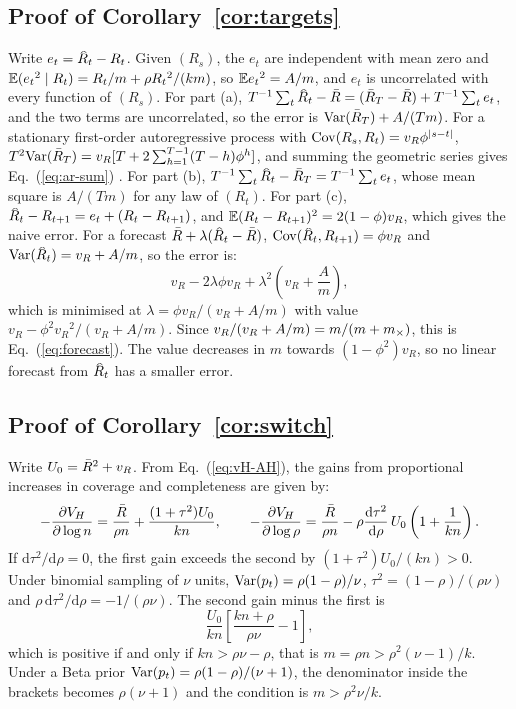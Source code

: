 \subsection{Proof of Corollary~\ref{cor:targets}}
\label{app:cor-targets}

Write $e_t=\Rhat_t-R_t$. Given $(R_s)$, the $e_t$ are independent with mean zero and $\mathbb{E}(e_t{}^2\mid R_t)=R_t/m+\rho R_t{}^2/(km)$, so $\mathbb{E} e_t{}^2=A/m$, and $e_t$ is uncorrelated with every function of $(R_s)$. For part (a), $T^{-1}\sum_t\Rhat_t-\Rbar=(\Rbar_T-\Rbar)+T^{-1}\sum_te_t$, and the two terms are uncorrelated, so the error is $\mathrm{Var}(\bar{R}_T)+A/(Tm)$. For a stationary first-order autoregressive process with $\mathrm{Cov}(R_s,R_t)=v_R\phi^{|s-t|}$, $T^2\mathrm{Var}(\bar{R}_T)=v_R[T+2\sum_{h=1}^{T-1}(T-h)\phi^h]$, and summing the geometric series gives Eq.~(\ref{eq:ar-sum}) \citep{hamilton1994time}. For part (b), $T^{-1}\sum_t\Rhat_t-\Rbar_T=T^{-1}\sum_te_t$, whose mean square is $A/(Tm)$ for any law of $(R_t)$. For part (c), $\Rhat_t-R_{t+1}=e_t+(R_t-R_{t+1})$, and $\mathbb{E}(R_t-R_{t+1})^2=2(1-\phi)v_R$, which gives the naive error. For a forecast $\Rbar+\lambda(\Rhat_t-\Rbar)$, $\Cov(\Rhat_t,R_{t+1})=\phi v_R$ and $\Var(\Rhat_t)=v_R+A/m$, so the error is:
\begin{equation}
  v_R-2\lambda\phi v_R+\lambda^2\left(v_R+\frac{A}{m}\right),
\end{equation}
which is minimised at $\lambda=\phi v_R/(v_R+A/m)$ with value $v_R-\phi^2v_R{}^2/(v_R+A/m)$. Since $v_R/(v_R+A/m)=m/(m+m_{\times})$, this is Eq.~(\ref{eq:forecast}). The value decreases in $m$ towards $(1-\phi^2)v_R$, so no linear forecast from $\Rhat_t$ has a smaller error.

\subsection{Proof of Corollary~\ref{cor:switch}}
\label{app:cor1}

Write $U_0=\bar{R}^2+v_R$. From Eq.~(\ref{eq:vH-AH}), the gains from proportional increases in coverage and completeness are given by:
\begin{equation}
  -\frac{\partial V_H}{\partial\log n}=\frac{\bar{R}}{\rho n}+\frac{(1+\tau^2)U_0}{kn},\qquad
  -\frac{\partial V_H}{\partial\log\rho}=\frac{\bar{R}}{\rho n}-\rho\frac{\mathrm{d}\tau^2}{\mathrm{d}\rho}\,U_0\left(1+\frac{1}{kn}\right).
\end{equation}
If $\mathrm{d}\tau^2/\mathrm{d}\rho=0$, the first gain exceeds the second by $(1+\tau^2)U_0/(kn)>0$. Under binomial sampling of $\nu$ units, $\mathrm{Var}(p_t)=\rho(1-\rho)/\nu$, $\tau^2=(1-\rho)/(\rho\nu)$ and $\rho\,\mathrm{d}\tau^2/\mathrm{d}\rho=-1/(\rho\nu)$. The second gain minus the first is
\begin{equation}
  \frac{U_0}{kn}\left[\frac{kn+\rho}{\rho\nu}-1\right],
\end{equation}
which is positive if and only if $kn>\rho\nu-\rho$, that is $m=\rho n>\rho^2(\nu-1)/k$. Under a Beta prior $\mathrm{Var}(p_t)=\rho(1-\rho)/(\nu+1)$, the denominator inside the brackets becomes $\rho(\nu+1)$ and the condition is $m>\rho^2\nu/k$.


